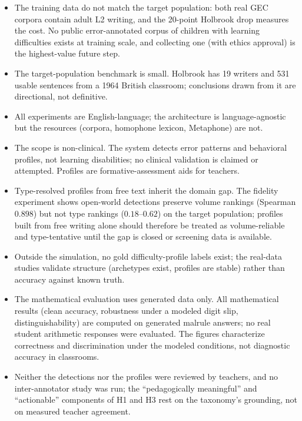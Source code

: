 \begin{itemize}
    \item The training data do not match the target population: both real GEC corpora contain adult L2 writing, and the 20-point Holbrook drop measures the cost. No public error-annotated corpus of children with learning difficulties exists at training scale, and collecting one (with ethics approval) is the highest-value future step.
    \item The target-population benchmark is small. Holbrook has 19 writers and 531 usable sentences from a 1964 British classroom; conclusions drawn from it are directional, not definitive.
    \item All experiments are English-language; the architecture is language-agnostic but the resources (corpora, homophone lexicon, Metaphone) are not.
    \item The scope is non-clinical. The system detects error patterns and behavioral profiles, not learning disabilities; no clinical validation is claimed or attempted. Profiles are formative-assessment aids for teachers.
    \item Type-resolved profiles from free text inherit the domain gap. The fidelity experiment shows open-world detections preserve volume rankings (Spearman $0.898$) but not type rankings ($0.18$--$0.62$) on the target population; profiles built from free writing alone should therefore be treated as volume-reliable and type-tentative until the gap is closed or screening data is available.
    \item Outside the simulation, no gold difficulty-profile labels exist; the real-data studies validate structure (archetypes exist, profiles are stable) rather than accuracy against known truth.
    \item The mathematical evaluation uses generated data only. All mathematical results (clean accuracy, robustness under a modeled digit slip, distinguishability) are computed on generated malrule answers; no real student arithmetic responses were evaluated. The figures characterize correctness and discrimination under the modeled conditions, not diagnostic accuracy in classrooms.
    \item Neither the detections nor the profiles were reviewed by teachers, and no inter-annotator study was run; the ``pedagogically meaningful'' and ``actionable'' components of H1 and H3 rest on the taxonomy's grounding, not on measured teacher agreement.
\end{itemize}

